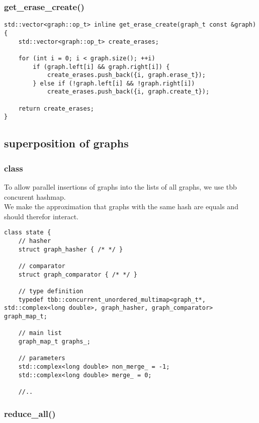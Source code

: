 \documentclass[11pt]{article}
\begin{document}
\subsubsection{get\_erase\_create()}

\begin{lstlisting}[style=CStyle]
std::vector<graph::op_t> inline get_erase_create(graph_t const &graph) {
	std::vector<graph::op_t> create_erases;

	for (int i = 0; i < graph.size(); ++i)
		if (graph.left[i] && graph.right[i]) {
			create_erases.push_back({i, graph.erase_t});
		} else if (!graph.left[i] && !graph.right[i])
			create_erases.push_back({i, graph.create_t});

	return create_erases;
}
\end{lstlisting}

\subsection{superposition of graphs}

\subsubsection{class}

To allow parallel insertions of graphs into the lists of all graphs, we use tbb concurent hashmap. \\

We make the approximation that graphs with the same hash are equals and should therefor interact.

\begin{lstlisting}[style=CStyle]
class state {
	// hasher
	struct graph_hasher { /* */ }

	// comparator
	struct graph_comparator { /* */ }

	// type definition
	typedef tbb::concurrent_unordered_multimap<graph_t*, std::complex<long double>, graph_hasher, graph_comparator> graph_map_t;

	// main list 
	graph_map_t graphs_;

	// parameters
	std::complex<long double> non_merge_ = -1;
	std::complex<long double> merge_ = 0;
	
	//..
\end{lstlisting}

\subsubsection{reduce\_all()}
\end{document}
